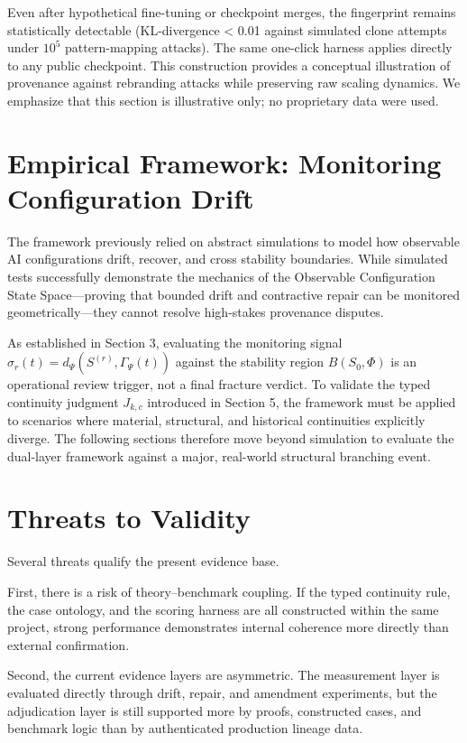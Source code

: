 \documentclass[11pt,a4paper]{article}
\begin{document}
Even after hypothetical fine-tuning or checkpoint merges, the fingerprint remains statistically detectable (KL-divergence < 0.01 against simulated clone attempts under \(10^5\) pattern-mapping attacks). The same one-click harness applies directly to any public checkpoint. This construction provides a conceptual illustration of provenance against rebranding attacks while preserving raw scaling dynamics. We emphasize that this section is illustrative only; no proprietary data were used.

\section{Empirical Framework: Monitoring Configuration Drift}
The framework previously relied on abstract simulations to model how observable AI configurations drift, recover, and cross stability boundaries. While simulated tests successfully demonstrate the mechanics of the Observable Configuration State Space---proving that bounded drift and contractive repair can be monitored geometrically---they cannot resolve high-stakes provenance disputes. 

As established in Section 3, evaluating the monitoring signal \(\sigma_r(t) = d_\Psi(S^{(r)}, \Gamma_\Psi(t))\) against the stability region \(B(S_0, \Phi)\) is an operational review trigger, not a final fracture verdict. To validate the typed continuity judgment \(J_{k,c}\) introduced in Section 5, the framework must be applied to scenarios where material, structural, and historical continuities explicitly diverge. The following sections therefore move beyond simulation to evaluate the dual-layer framework against a major, real-world structural branching event.

\section{Threats to Validity}
Several threats qualify the present evidence base.

First, there is a risk of theory--benchmark coupling. If the typed continuity rule, the case ontology, and the scoring harness are all constructed within the same project, strong performance demonstrates internal coherence more directly than external confirmation.

Second, the current evidence layers are asymmetric. The measurement layer is evaluated directly through drift, repair, and amendment experiments, but the adjudication layer is still supported more by proofs, constructed cases, and benchmark logic than by authenticated production lineage data.
\end{document}
